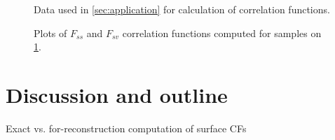 \documentclass[reprint,amsmath,amssymb,aps,pre]{revtex4-1}
\begin{document}
\begin{figure}[t]
{    \label{fig:carbonate2}}
  \hfill
  \caption[]{Data used in \cref{sec:application} for calculation of correlation
    functions.}
  \label{fig:real-data}
\end{figure}

\begin{figure}[t]
  \centering
  \hfill
  \caption[]{Plots of $F_{ss}$ and $F_{sv}$ correlation functions computed for
    samples on \cref{fig:real-data}.}
  \label{fig:real-data-plots}
\end{figure}

\section{Discussion and outline}
Exact vs. for-reconstruction computation of surface CFs
\end{document}
